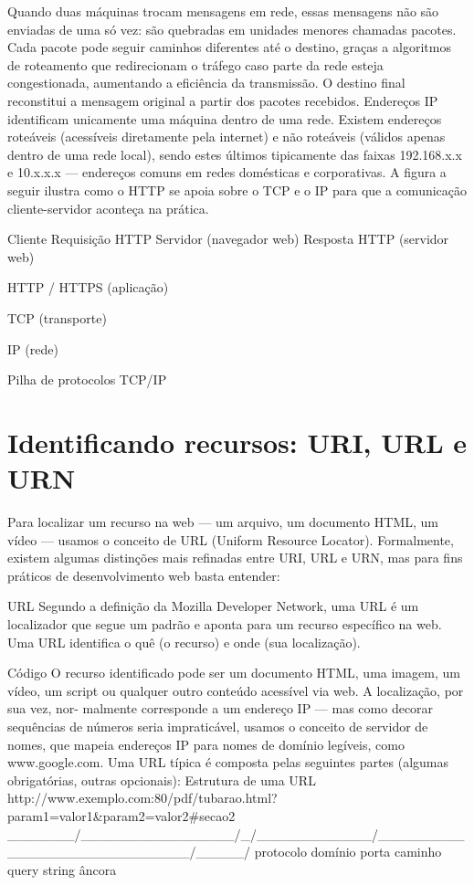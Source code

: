 Quando duas máquinas trocam mensagens em rede, essas mensagens não são enviadas de uma só vez: são quebradas em unidades menores chamadas pacotes. Cada pacote pode seguir caminhos diferentes até o destino, graças a algoritmos de roteamento que redirecionam o tráfego caso parte da rede esteja congestionada, aumentando a eficiência da transmissão. O destino final reconstitui a mensagem original a partir dos pacotes recebidos. Endereços IP identificam unicamente uma máquina dentro de uma rede. Existem endereços roteáveis (acessíveis diretamente pela internet) e não roteáveis (válidos apenas dentro de uma rede local), sendo estes últimos tipicamente das faixas 192.168.x.x e 10.x.x.x — endereços comuns em redes domésticas e corporativas. A figura a seguir ilustra como o HTTP se apoia sobre o TCP e o IP para que a comunicação cliente-servidor aconteça na prática.

\begin{infobox}{Cliente           Requisição HTTP             Servidor}
(navegador web) Resposta HTTP (servidor web)
\end{infobox}

HTTP / HTTPS (aplicação)

TCP (transporte)

IP (rede)

Pilha de protocolos TCP/IP

\section{Identificando recursos: URI, URL e URN}

Para localizar um recurso na web — um arquivo, um documento HTML, um vídeo — usamos o conceito de URL (Uniform Resource Locator). Formalmente, existem algumas distinções mais refinadas entre URI, URL e URN, mas para fins práticos de desenvolvimento web basta entender:

\begin{infobox}{URL}
Segundo a definição da Mozilla Developer Network, uma URL é um localizador que segue um padrão e aponta para um recurso específico na web. Uma URL identifica o quê (o recurso) e onde (sua localização).
\end{infobox}

\begin{codebox}{Código}
O recurso identificado pode ser um documento HTML, uma imagem, um vídeo, um
script ou qualquer outro conteúdo acessível via web. A localização, por sua vez, nor-
malmente corresponde a um endereço IP — mas como decorar sequências de números
seria impraticável, usamos o conceito de servidor de nomes, que mapeia endereços
IP para nomes de domínio legíveis, como www.google.com.
Uma URL típica é composta pelas seguintes partes (algumas obrigatórias, outras
opcionais):
Estrutura de uma URL
http://www.exemplo.com:80/pdf/tubarao.html?param1=valor1&param2=valor2#secao2
\_______/\________________/\_/\____________/\____________________________/\_____/
protocolo      domínio    porta    caminho              query string        âncora
\end{codebox}


